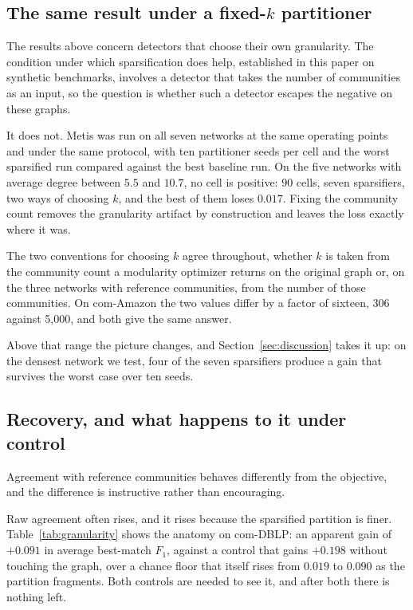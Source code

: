 \subsection{The same result under a fixed-\texorpdfstring{$k$}{k} partitioner}\label{sec:negative:metis}

The results above concern
detectors that choose their own granularity. The condition under which
sparsification does help, established in this paper on synthetic benchmarks,
involves a detector that takes the number of communities as an input, so the
question is whether such a detector escapes the negative on these graphs.

It does not. Metis was run on all seven networks at the same operating points and
under the same protocol, with ten partitioner seeds per cell and the worst
sparsified run compared against the best baseline run. On the five networks with
average degree between $5.5$ and $10.7$, no cell is positive: 90 cells, seven
sparsifiers, two ways of choosing $k$, and the best of them loses $0.017$. Fixing
the community count removes the granularity artifact by construction and leaves
the loss exactly where it was.

The two conventions for choosing $k$ agree throughout, whether $k$ is taken from
the community count a modularity optimizer returns on the original graph or, on
the three networks with reference communities, from the number of those
communities. On com-Amazon the two values differ by a factor of sixteen, 306
against 5,000, and both give the same answer.

Above that range the picture changes, and Section~\ref{sec:discussion} takes it up:
on the densest network we test, four of the seven sparsifiers produce a gain that
survives the worst case over ten seeds.

\subsection{Recovery, and what happens to it under control}\label{sec:negative:recovery}

Agreement with reference communities behaves differently from the objective, and
the difference is instructive rather than encouraging.

Raw agreement often rises, and it rises because the sparsified partition is finer.
Table~\ref{tab:granularity} shows the anatomy on com-DBLP: an apparent gain of
$+0.091$ in average best-match $F_1$, against a control that gains $+0.198$ without
touching the graph, over a chance floor that itself rises from $0.019$ to $0.090$
as the partition fragments. Both controls are needed to see it, and after both
there is nothing left.

